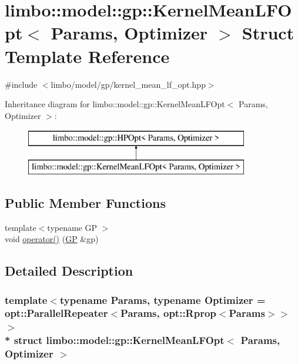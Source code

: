 \hypertarget{structlimbo_1_1model_1_1gp_1_1_kernel_mean_l_f_opt}{}\section{limbo\+:\+:model\+:\+:gp\+:\+:Kernel\+Mean\+L\+F\+Opt$<$ Params, Optimizer $>$ Struct Template Reference}
\label{structlimbo_1_1model_1_1gp_1_1_kernel_mean_l_f_opt}


{\ttfamily \#include $<$limbo/model/gp/kernel\+\_\+mean\+\_\+lf\+\_\+opt.\+hpp$>$}

Inheritance diagram for limbo\+:\+:model\+:\+:gp\+:\+:Kernel\+Mean\+L\+F\+Opt$<$ Params, Optimizer $>$\+:\begin{figure}[H]
\begin{center}
\leavevmode
\includegraphics[height=2.000000cm]{structlimbo_1_1model_1_1gp_1_1_kernel_mean_l_f_opt}
\end{center}
\end{figure}
\subsection*{Public Member Functions}
\begin{DoxyCompactItemize}
\item 
{\footnotesize template$<$typename GP $>$ }\\void \hyperlink{structlimbo_1_1model_1_1gp_1_1_kernel_mean_l_f_opt_afdd30bef6dbad7b8f6e459bcea7f4412}{operator()} (\hyperlink{classlimbo_1_1model_1_1_g_p}{GP} \&gp)
\end{DoxyCompactItemize}


\subsection{Detailed Description}
\subsubsection*{template$<$typename Params, typename Optimizer = opt\+::\+Parallel\+Repeater$<$\+Params, opt\+::\+Rprop$<$\+Params$>$$>$$>$\\*
struct limbo\+::model\+::gp\+::\+Kernel\+Mean\+L\+F\+Opt$<$ Params, Optimizer $>$}

